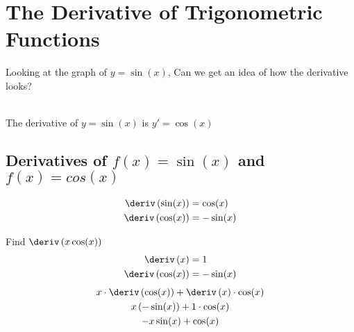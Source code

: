 
\section{The Derivative of Trigonometric Functions}
Looking at the graph of $y=\sin(x)$, Can we get an idea of how the derivative looks? \\
\\
The derivative of $y = \sin(x)$ is $y' = \cos(x)$
\subsection{Derivatives of $f(x) = \sin(x)$ and $f(x) = cos(x)$}
\begin{align}
    \deriv \left(\sin(x)\right) &= \cos(x) \\
    \deriv \left(\cos(x)\right) &= -\sin(x)
\end{align}
\begin{example}
    Find $\deriv \left(x\cos(x)\right)$
    \begin{align*}
        \deriv \left(x\right) &= 1 \\
        \deriv \left(\cos(x)\right) &= -\sin(x)
    \end{align*}
    \begin{gather*}
        x \cdot \deriv \left(\cos(x)\right) + \deriv \left(x\right) \cdot \cos(x) \\
        x \left(-\sin(x)\right) + 1 \cdot \cos(x) \\
        -x\sin(x) + \cos(x)
    \end{gather*}
\end{example}

